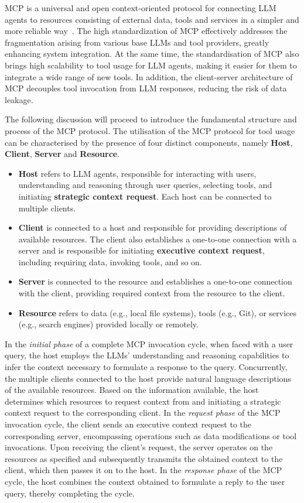 \documentclass[10pt,preprint]{article}
\begin{document}
MCP is a universal and open context-oriented protocol for connecting LLM agents to resources consisting of external data, tools and services in a simpler and more reliable way~\citep{anthropic2025}. The high standardization of MCP effectively addresses the fragmentation arising from various base LLMs and tool providers, greatly enhancing system integration. At the same time, the standardisation of MCP also brings high scalability to tool usage for LLM agents, making it easier for them to integrate a wide range of new tools. In addition, the client-server architecture of MCP decouples tool invocation from LLM responses, reducing the risk of data leakage.


The following discussion will proceed to introduce the fundamental structure and process of the MCP protocol. The utilisation of the MCP protocol for tool usage can be characterised by the presence of four distinct components, namely \textbf{Host}, \textbf{Client}, \textbf{Server} and \textbf{Resource}. 

\begin{itemize}
    \item \textbf{Host} refers to LLM agents, responsible for interacting with users, understanding and reasoning through user queries, selecting tools, and initiating \textbf{strategic context request}. Each host can be connected to multiple clients.
    \item \textbf{Client} is connected to a host and responsible for providing descriptions of available resources. The client also establishes a one-to-one connection with a server and is responsible for initiating \textbf{executive context request}, including requiring data, invoking tools, and so on.
    \item \textbf{Server} is connected to the resource and establishes a one-to-one connection with the client, providing required context from the resource to the client.
    \item \textbf{Resource} refers to data (e.g., local file systems), tools (e.g., Git), or services (e.g., search engines) provided locally or remotely.
\end{itemize}

In the \textit{initial phase} of a complete MCP invocation cycle, when faced with a user query, the host employs the LLMs' understanding and reasoning capabilities to infer the context necessary to formulate a response to the query. Concurrently, the multiple clients connected to the host provide natural language descriptions of the available resources. Based on the information available, the host determines which resources to request context from and initiating a strategic context request to the corresponding client. In the \textit{request phase} of the MCP invocation cycle, the client sends an executive context request to the corresponding server, encompassing operations such as data modifications or tool invocations. Upon receiving the client's request, the server operates on the resources as specified and subsequently transmits the obtained context to the client, which then passes it on to the host. In the \textit{response phase} of the MCP cycle, the host combines the context obtained to formulate a reply to the user query, thereby completing the cycle.
\end{document}
